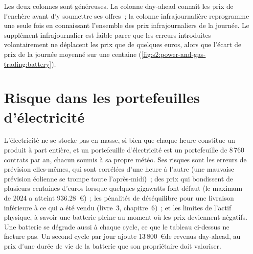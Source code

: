 Les deux colonnes sont généreuses. La colonne day-ahead connaît les prix de l'enchère avant d'y soumettre ses offres~; la colonne infrajournalière reprogramme une seule fois en connaissant
l'ensemble des prix infrajournaliers de la journée. Le supplément infrajournalier est faible parce que les erreurs introduites volontairement ne déplacent les prix que de quelques euros, alors que l'écart de prix de la journée
moyenné sur une centaine (\cref{fig:s2:power-and-gas-trading:battery}).

\begin{omfigure}

\label{fig:s2:power-and-gas-trading:battery}
\end{omfigure}

\section{Risque dans les portefeuilles d'électricité}

L'électricité ne se stocke pas en masse, si bien que chaque heure constitue un produit à part entière, et un portefeuille d'électricité est un portefeuille de 8\,760 contrats par an, chacun soumis à sa propre météo.
Ses risques sont les erreurs de prévision elles-mêmes, qui sont corrélées d'une heure à l'autre (une mauvaise prévision éolienne se trompe toute l'après-midi)~; des prix qui bondissent
de plusieurs centaines d'euros lorsque quelques gigawatts font défaut (le maximum de 2024 a atteint 936.28~\euro)~; les pénalités de déséquilibre pour une livraison inférieure à ce qui a été vendu (livre~3,
chapitre~6)~; et les limites de l'actif physique, à savoir une batterie pleine au moment où les prix deviennent négatifs. Une batterie se dégrade aussi à chaque cycle, ce que le
tableau ci-dessus ne facture pas. Un second cycle par jour ajoute 13\,800~\euro de revenus day-ahead, au prix d'une durée de vie de la batterie que son propriétaire doit valoriser.


